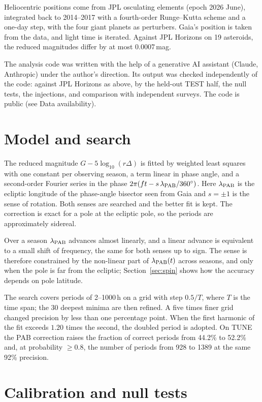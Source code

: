 Heliocentric positions come from JPL osculating elements (epoch 2026 June), integrated back to 2014--2017
with a fourth-order Runge--Kutta scheme and a one-day step, with the four giant planets as perturbers. Gaia's
position is taken from the data, and light time is iterated. Against JPL Horizons on 19 asteroids, the
reduced magnitudes differ by at most 0.0007\,mag.

The analysis code was written with the help of a generative AI assistant (Claude, Anthropic) under the
author's direction. Its output was checked independently of the code: against JPL Horizons as above, by
the held-out TEST half, the null tests, the injections, and comparison with independent surveys. The code is
public (see Data availability).

\section{Model and search}\label{sec:model}

The reduced magnitude $G-5\log_{10}(r\Delta)$ is fitted by weighted least squares with one constant per
observing season, a term linear in phase angle, and a second-order Fourier series in the phase
$2\pi(ft-s\,\lambda_{\rm PAB}/360^\circ)$. Here $\lambda_{\rm PAB}$ is the ecliptic longitude of the
phase-angle bisector seen from Gaia \citep{Harris1984} and $s=\pm1$ is the sense of rotation. Both senses
are searched and the better fit is kept. The correction is exact for a pole at the ecliptic pole, so the
periods are approximately sidereal.

Over a season $\lambda_{\rm PAB}$ advances almost linearly, and a linear advance is equivalent to a small
shift of frequency, the same for both senses up to sign. The sense is therefore constrained by the
non-linear part of $\lambda_{\rm PAB}(t)$ across seasons, and only when the pole is far from the ecliptic;
Section~\ref{sec:spin} shows how the accuracy depends on pole latitude.

The search covers periods of 2--1000\,h on a grid with step $0.5/T$, where $T$ is the time span; the 30
deepest minima are then refined. A five times finer grid changed precision by less than one percentage
point. When the first harmonic of the fit exceeds $1.20$ times the second, the doubled period is adopted.
On TUNE the PAB correction raises the fraction of correct periods from 44.2\% to 52.2\% and, at probability
$\ge0.8$, the number of periods from 928 to 1389 at the same 92\% precision.

\section{Calibration and null tests}


